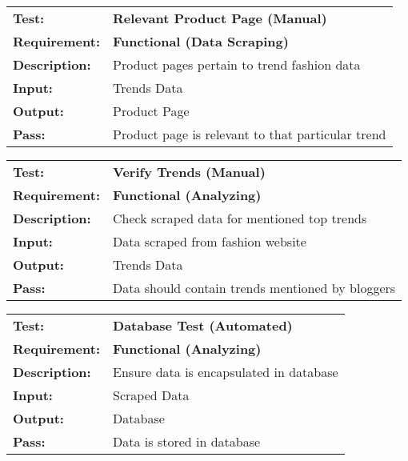 \documentclass{article}
\begin{document}
	\begin{mdframed}[linewidth=1pt]
	\begin{tabularx}{\textwidth}{@{}p{3cm}X@{}}
	{\bf Test:} & {\bf Relevant Product Page (Manual)}\\[\baselineskip]
	{\bf Requirement:} & {\bf Functional (Data Scraping)}\\[\baselineskip]
	{\bf Description:} & Product pages pertain to trend fashion data\\[0.5\baselineskip]
	{\bf Input:} &  Trends Data\\[0.5\baselineskip]
	{\bf Output:} & Product Page\\[0.5\baselineskip]
	{\bf Pass:} & Product page is relevant to that particular trend
	\end{tabularx}
	\end{mdframed}

	\begin{mdframed}[linewidth=1pt]
	\begin{tabularx}{\textwidth}{@{}p{3cm}X@{}}
	{\bf Test:} & {\bf Verify Trends (Manual)}\\[\baselineskip]
	{\bf Requirement:} & {\bf Functional (Analyzing)}\\[\baselineskip]
	{\bf Description:} & Check scraped data for mentioned top trends\\[0.5\baselineskip]
	{\bf Input:} &  Data scraped from fashion website\\[0.5\baselineskip]
	{\bf Output:} & Trends Data\\[0.5\baselineskip]
	{\bf Pass:} & Data should contain trends mentioned by bloggers
	\end{tabularx}
	\end{mdframed}

	\begin{mdframed}[linewidth=1pt]
	\begin{tabularx}{\textwidth}{@{}p{3cm}X@{}}
	{\bf Test:} & {\bf Database Test (Automated)}\\[\baselineskip]
	{\bf Requirement:} & {\bf Functional (Analyzing)}\\[\baselineskip]
	{\bf Description:} & Ensure data is encapsulated in database\\[0.5\baselineskip]
	{\bf Input:} &  Scraped Data\\[0.5\baselineskip]
	{\bf Output:} & Database\\[0.5\baselineskip]
	{\bf Pass:} & Data is stored in database
	\end{tabularx}
	\end{mdframed}
\end{document}
